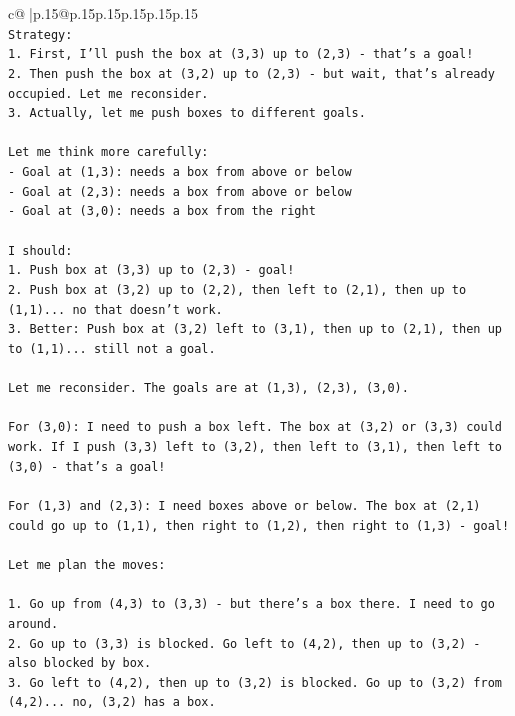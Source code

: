 \documentclass{article}
\begin{document}
{\begin{supertabular}{c@{$\;$}|p{.15\linewidth}@{}p{.15\linewidth}p{.15\linewidth}p{.15\linewidth}p{.15\linewidth}p{.15\linewidth}}
{{{\\ 
\texttt{Strategy:} \\
\texttt{1. First, I'll push the box at (3,3) up to (2,3) {-} that's a goal!} \\
\texttt{2. Then push the box at (3,2) up to (2,3) {-} but wait, that's already occupied. Let me reconsider.} \\
\texttt{3. Actually, let me push boxes to different goals.} \\
\\ 
\texttt{Let me think more carefully:} \\
\texttt{{-} Goal at (1,3): needs a box from above or below} \\
\texttt{{-} Goal at (2,3): needs a box from above or below  } \\
\texttt{{-} Goal at (3,0): needs a box from the right} \\
\\ 
\texttt{I should:} \\
\texttt{1. Push box at (3,3) up to (2,3) {-} goal!} \\
\texttt{2. Push box at (3,2) up to (2,2), then left to (2,1), then up to (1,1)... no that doesn't work.} \\
\texttt{3. Better: Push box at (3,2) left to (3,1), then up to (2,1), then up to (1,1)... still not a goal.} \\
\\ 
\texttt{Let me reconsider. The goals are at (1,3), (2,3), (3,0). } \\
\\ 
\texttt{For (3,0): I need to push a box left. The box at (3,2) or (3,3) could work. If I push (3,3) left to (3,2), then left to (3,1), then left to (3,0) {-} that's a goal!} \\
\\ 
\texttt{For (1,3) and (2,3): I need boxes above or below. The box at (2,1) could go up to (1,1), then right to (1,2), then right to (1,3) {-} goal!} \\
\\ 
\texttt{Let me plan the moves:} \\
\\ 
\texttt{1. Go up from (4,3) to (3,3) {-} but there's a box there. I need to go around.} \\
\texttt{2. Go up to (3,3) is blocked. Go left to (4,2), then up to (3,2) {-} also blocked by box.} \\
\texttt{3. Go left to (4,2), then up to (3,2) is blocked. Go up to (3,2) from (4,2)... no, (3,2) has a box.} \\
}}}
\end{supertabular}}
\end{document}
